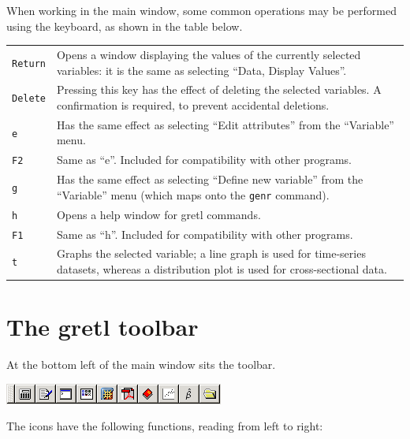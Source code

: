 When working in the main  window, some common operations
may be performed using the keyboard, as shown in the table below.

\begin{center}
\begin{tabular}{lp{5in}}
\texttt{Return} & Opens a window displaying the values of the currently
  selected variables: it is the same as selecting ``Data, Display
  Values''. \\
\texttt{Delete} & Pressing this key has the effect of deleting the
  selected variables. A confirmation is required, to prevent
  accidental deletions. \\
\texttt{e} & Has the same effect as selecting ``Edit
  attributes'' from the ``Variable'' menu. \\
\texttt{F2} & Same as ``e''. Included for compatibility with other
  programs.\\
\texttt{g} & Has the same effect as selecting ``Define new
  variable'' from the ``Variable'' menu (which maps onto the
  \texttt{genr} command).\\
\texttt{h} & Opens a help window for gretl commands.\\
\texttt{F1} & Same as ``h''. Included for compatibility with other
  programs.\\
\texttt{t} & Graphs the selected variable; a line graph is used for
  time-series datasets, whereas a distribution plot is used for
  cross-sectional data. 
\end{tabular}
\end{center}

\section{The gretl toolbar}
\label{toolbar}

At the bottom left of the main window sits the toolbar.

\begin{center}
  \includegraphics[scale=0.5]{figures/toolbar}
\end{center}

The icons have the following functions, reading from left to right:

